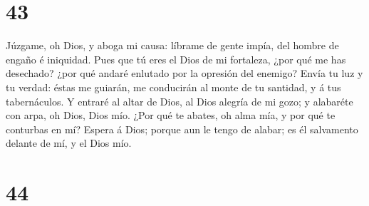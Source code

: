\hypertarget{section-42}{%
\section{43}\label{section-42}}

 Júzgame, oh Dios, y aboga mi causa: líbrame de gente impía,
del hombre de engaño é iniquidad.  Pues que tú eres el Dios
de mi fortaleza, ¿por qué me has desechado? ¿por qué andaré enlutado por
la opresión del enemigo?  Envía tu luz y tu verdad: éstas me
guiarán, me conducirán al monte de tu santidad, y á tus tabernáculos.
 Y entraré al altar de Dios, al Dios alegría de mi gozo; y
alabaréte con arpa, oh Dios, Dios mío.  ¿Por qué te abates,
oh alma mía, y por qué te conturbas en mí? Espera á Dios; porque aun le
tengo de alabar; es él salvamento delante de mí, y el Dios mío.

\hypertarget{section-43}{%
\section{44}\label{section-43}}

